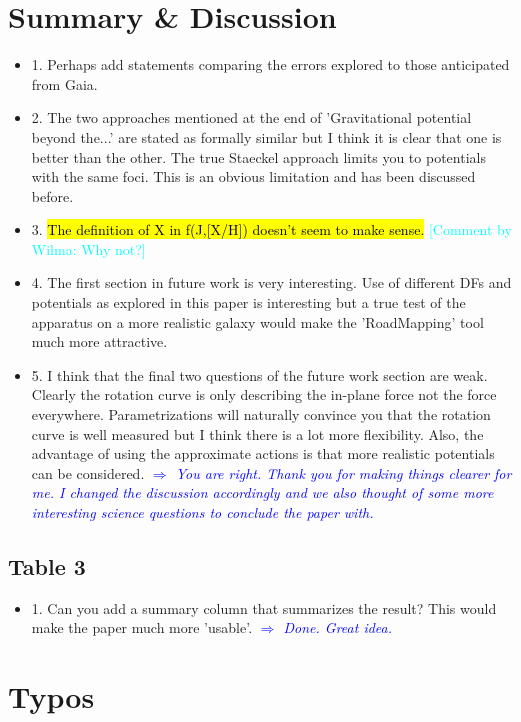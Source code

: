 \documentclass[10pt,a4paper]{article}
\newcommand{\HW}[1]{\textcolor{Cyan}{#1}}
\newcommand{\Comment}[1]{\textsl{\textcolor{Blue}{$\Longrightarrow$ {#1}}}}
\begin{document}
\section{Summary \& Discussion}
\begin{itemize}
\item 1. Perhaps add statements comparing the errors explored to those anticipated from Gaia.
\item 2. The two approaches mentioned at the end of 'Gravitational potential beyond the...' are stated as formally similar but I think it is clear that one is better than the other. The true Staeckel approach limits you to potentials with the same foci. This is an obvious limitation and has been discussed before.
\item 3. \hl{The definition of X in f(J,[X/H]) doesn't seem to make sense.} \HW{[Comment by Wilma: Why not?]}
\item 4. The first section in future work is very interesting. Use of different DFs and potentials as explored in this paper is interesting but a true test of the apparatus on a more realistic galaxy would make the 'RoadMapping' tool much more attractive.
\item 5. I think that the final two questions of the future work section are weak. Clearly the rotation curve is only describing the in-plane force not the force everywhere. Parametrizations will naturally convince you that the rotation curve is well measured but I think there is a lot more flexibility. Also, the advantage of using the approximate actions is that more realistic potentials can be considered. \Comment{You are right. Thank you for making things clearer for me. I changed the discussion accordingly and we also thought of some more interesting science questions to conclude the paper with.}
\end{itemize}

\subsection{Table 3}
\begin{itemize}
\item 1. Can you add a summary column that summarizes the result? This would make the paper much more 'usable'. \Comment{Done. Great idea.}
\end{itemize}


\section{Typos}
\end{document}
